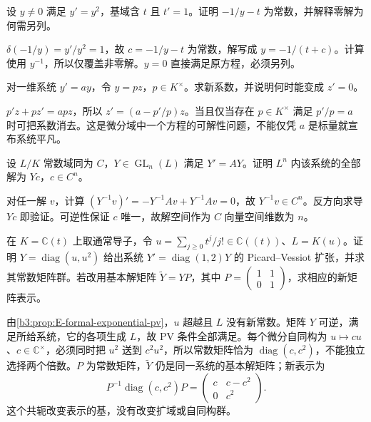 \begin{exercise}\label{b3:ex:E-riccati-pole}
	设 \(y\ne0\) 满足 \(y'=y^2\)，基域含 \(t\) 且 \(t'=1\)。证明 \(-1/y-t\) 为常数，并解释零解为何需另列。
\end{exercise}
\begin{solution}
	\(\delta(-1/y)=y'/y^2=1\)，故 \(c=-1/y-t\) 为常数，解写成 \(y=-1/(t+c)\)。计算使用 \(y^{-1}\)，所以仅覆盖非零解。\(y=0\) 直接满足原方程，必须另列。
\end{solution}

\begin{exercise}\label{b3:ex:E-module-basis-change}
	对一维系统 \(y'=ay\)，令 \(y=pz\)，\(p\in K^\times\)。求新系数，并说明何时能变成 \(z'=0\)。
\end{exercise}
\begin{solution}
	\(p'z+pz'=apz\)，所以 \(z'=(a-p'/p)z\)。当且仅当存在 \(p\in K^\times\) 满足 \(p'/p=a\) 时可把系数消去。这是微分域中一个方程的可解性问题，不能仅凭 \(a\) 是标量就宣布系统平凡。
\end{solution}

\begin{exercise}\label{b3:ex:E-constant-solution-space}
	设 \(L/K\) 常数域同为 \(C\)，\(Y\in\operatorname{GL}_n(L)\) 满足 \(Y'=AY\)。证明 \(L^n\) 内该系统的全部解为 \(Yc\)，\(c\in C^n\)。
\end{exercise}
\begin{solution}
	对任一解 \(v\)，计算 \((Y^{-1}v)'=-Y^{-1}Av+Y^{-1}Av=0\)，故 \(Y^{-1}v\in C^n\)。反方向求导 \(Yc\) 即验证。可逆性保证 \(c\) 唯一，故解空间作为 \(C\) 向量空间维数为 \(n\)。
\end{solution}

\begin{exercise}\label{b3:ex:E-pv-exponential-group}
	在 \(K=\mathbb C(t)\) 上取通常导子，令 \(u=\sum_{j\ge0}t^j/j!\in\mathbb C(\!(t)\!)\)、\(L=K(u)\)。证明 \(Y=\operatorname{diag}(u,u^2)\) 给出系统 \(Y'=\operatorname{diag}(1,2)Y\) 的 Picard--Vessiot 扩张，并求其常数矩阵群。若改用基本解矩阵 \(\widetilde Y=YP\)，其中 \(P=\left(\begin{smallmatrix}1&1\\0&1\end{smallmatrix}\right)\)，求相应的新矩阵表示。
\end{exercise}
\begin{solution}
	由\cref{b3:prop:E-formal-exponential-pv}，\(u\) 超越且 \(L\) 没有新常数。矩阵 \(Y\) 可逆，满足所给系统，它的各项生成 \(L\)，故 PV 条件全部满足。每个微分自同构为 \(u\mapsto cu\)、\(c\in\mathbb C^\times\)，必须同时把 \(u^2\) 送到 \(c^2u^2\)，所以常数矩阵恰为 \(\operatorname{diag}(c,c^2)\)，不能独立选择两个倍数。\(P\) 为常数矩阵，\(\widetilde Y\) 仍是同一系统的基本解矩阵；新表示为
	\[
		P^{-1}\operatorname{diag}(c,c^2)P
		=\begin{pmatrix}c&c-c^2\\0&c^2\end{pmatrix}.
	\]
	这个共轭改变表示的基，没有改变扩域或自同构群。
\end{solution}

